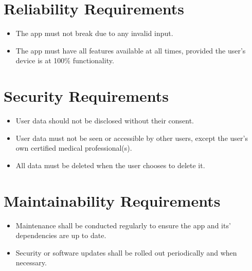 \documentclass[a4paper]{scrreprt}
\begin{document}
\section{Reliability Requirements}
\begin{itemize}
    \item The app must not break due to any invalid input.
    \item The app must have all features available at all times, provided the user's device is at 100\% functionality.
\end{itemize}
\section{Security Requirements}
\begin{itemize}
    \item User data should not be disclosed without their consent.
    \item User data must not be seen or accessible by other users, except the user's own certified medical professional(s).
    \item All data must be deleted when the user chooses to delete it.
\end{itemize}
\section{Maintainability Requirements}
\begin{itemize}
    \item Maintenance shall be conducted regularly to ensure the app and its' dependencies are up to date.
    \item Security or software updates shall be rolled out periodically and when necessary.
\end{itemize}
\end{document}
